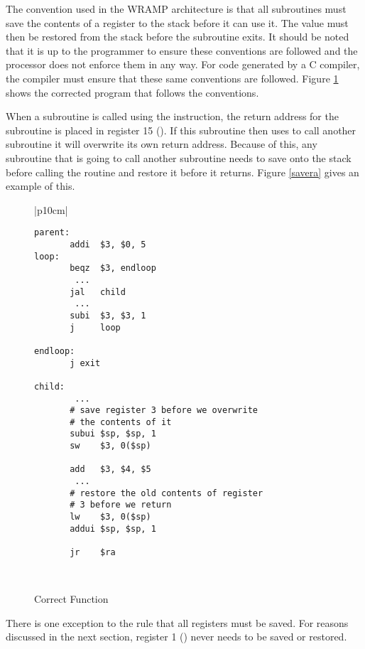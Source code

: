 The convention used in the WRAMP architecture is that all subroutines
must save the contents of a register to the stack before it can use
it. The value must then be restored from the stack before the
subroutine exits. It should be noted that it is up to the programmer
to ensure these conventions are followed and the processor does not
enforce them in any way. For code generated by a C compiler, the
compiler must ensure that these same conventions are followed. Figure
\ref{fig:correctcode} shows the corrected program that follows the
conventions.

When a subroutine is called using the  instruction, the
return address for the subroutine is placed in register 15
(). If this subroutine then uses  to call another
subroutine it will overwrite its own return address. Because of this,
any subroutine that is going to call another subroutine needs to save
 onto the stack before calling the routine and restore it
before it returns. Figure \ref{savera} gives an example of this.


%
%
\begin{figure}[!hb]
\begin{footnotesize}
\begin{center}
\begin{tabular}{|p{10cm}|}
\hline
\begin{verbatim}
parent:
       addi  $3, $0, 5
loop:
       beqz  $3, endloop
        ...
       jal   child
        ...
       subi  $3, $3, 1
       j     loop

endloop:
       j exit

child:
        ...
       # save register 3 before we overwrite
       # the contents of it
       subui $sp, $sp, 1
       sw    $3, 0($sp)

       add   $3, $4, $5
        ...
       # restore the old contents of register
       # 3 before we return
       lw    $3, 0($sp)
       addui $sp, $sp, 1

       jr    $ra
\end{verbatim}
\\
\hline
\end{tabular}
\end{center}
\end{footnotesize}
\caption{Correct Function}
\label{fig:correctcode}
\end{figure}

There is one exception to the rule that all registers must be
saved. For reasons discussed in the next section, register 1
() never needs to be saved or restored.


